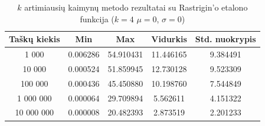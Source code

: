 \begin{table}[H]
    \centering
    \begin{tabular}{|c|c|c|c|c|}
        \hline
        \textbf{Taškų kiekis} & \textbf{Min} & \textbf{Max} & \textbf{Vidurkis} & \textbf{Std. nuokrypis} \\ \hline
        1 000        & 0.006286 & 54.910431 & 11.446165 & 9.384491 \\ \hline
        10 000       & 0.000524 & 51.859945 & 12.730128 & 9.523309 \\ \hline
        100 000      & 0.000436 & 45.450880 & 10.198760 & 7.544849 \\ \hline
        1 000 000    & 0.000064 & 29.709894 & 5.562611 & 4.151322 \\ \hline
        10 000 000   & 0.000008 & 20.482393 & 2.873519 & 2.201233 \\ \hline
    \end{tabular}
    \caption{$k$ artimiausių kaimynų metodo rezultatai su Rastrigin'o etalono funkcija ($k = 4$ $\mu = 0$, $\sigma = 0$)}
\end{table}